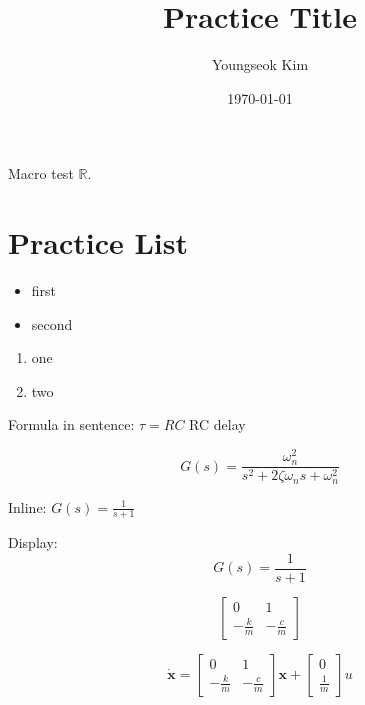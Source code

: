 \documentclass[11pt]{article}
\title{Practice Title}
\author{Youngseok Kim}
\date{\today}
\newcommand{\R}{\mathbb{R}}
\begin{document}
\maketitle


Macro test $\R$.

\section{Practice List}
\begin{itemize}
    \item first
    \item second
\end{itemize}

\begin{enumerate}
    \item one
    \item two
\end{enumerate}

Formula in sentence: $\tau = RC$ RC delay

\begin{equation}
    G(s) = \frac{\omega_n^2}{s^2 + 2\zeta\omega_n s + \omega_n^2}
\end{equation}

Inline: $G(s) = \frac{1}{s + 1}$

Display:
\begin{equation}
    G(s) = \frac{1}{s + 1}
\end{equation}

\begin{equation}
\begin{bmatrix} 0 & 1 \\ -\frac{k}{m} & -\frac{c}{m}
\end{bmatrix}
\end{equation}

\begin{equation}
\dot{\mathbf{x}} =
\begin{bmatrix} 0 & 1 \\ -\frac{k}{m} & -\frac{c}{m} 
\end{bmatrix}
\mathbf{x} +
\begin{bmatrix} 0 \\ \frac{1}{m} \end{bmatrix} u
\end{equation}
\end{document}
